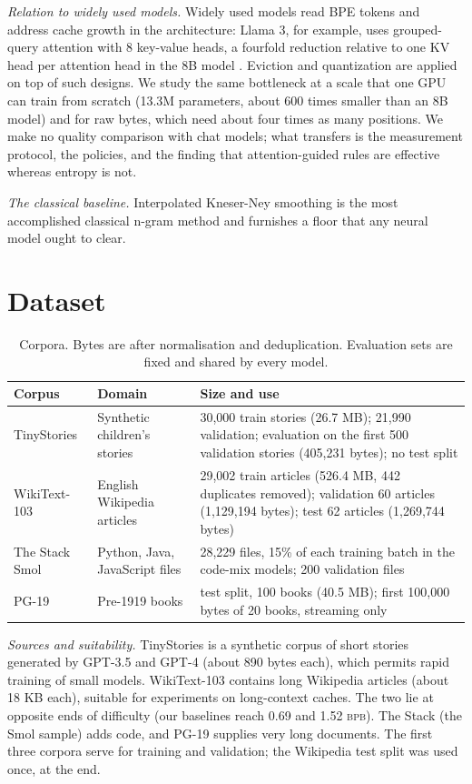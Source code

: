 \documentclass[10pt,twocolumn]{extarticle}
\newcommand{\bpb}{\textsc{bpb}}
\begin{document}
\textit{Relation to widely used models.} Widely used models read BPE tokens and address cache growth in the architecture: Llama 3, for example, uses grouped-query attention with 8 key-value heads, a fourfold reduction relative to one KV head per attention head in the 8B model \citep{llama3team2024}. Eviction and quantization are applied on top of such designs. We study the same bottleneck at a scale that one GPU can train from scratch (13.3M parameters, about 600 times smaller than an 8B model) and for raw bytes, which need about four times as many positions. We make no quality comparison with chat models; what transfers is the measurement protocol, the policies, and the finding that attention-guided rules are effective whereas entropy is not.


\textit{The classical baseline.} Interpolated Kneser-Ney smoothing \citep{kneser1995improved,chen1999smoothing} is the most accomplished classical n-gram method and furnishes a floor that any neural model ought to clear.

\section{Dataset}\label{sec:data}
\begin{table}[!t]
\centering\footnotesize
\caption{Corpora. Bytes are after normalisation and deduplication. Evaluation sets are fixed and shared by every model.}\label{tab:data}
\begin{tabular}{@{}p{2.3cm}p{4.2cm}p{10.0cm}@{}}
\toprule
Corpus & Domain & Size and use\\
\midrule
TinyStories & Synthetic children's stories & 30,000 train stories (26.7 MB); 21,990 validation; evaluation on the first 500 validation stories (405,231 bytes); no test split\\
WikiText-103 & English Wikipedia articles & 29,002 train articles (526.4 MB, 442 duplicates removed); validation 60 articles (1,129,194 bytes); test 62 articles (1,269,744 bytes)\\
The Stack Smol & Python, Java, JavaScript files & 28,229 files, 15\% of each training batch in the code-mix models; 200 validation files\\
PG-19 & Pre-1919 books & test split, 100 books (40.5 MB); first 100,000 bytes of 20 books, streaming only\\
\bottomrule
\end{tabular}
\end{table}

\textit{Sources and suitability.} TinyStories \citep{eldan2023tinystories} is a synthetic corpus of short stories generated by GPT-3.5 and GPT-4 (about 890 bytes each), which permits rapid training of small models. WikiText-103 \citep{merity2016pointer} contains long Wikipedia articles (about 18 KB each), suitable for experiments on long-context caches. The two lie at opposite ends of difficulty (our baselines reach 0.69 and 1.52 \bpb). The Stack \citep{kocetkov2022stack} (the Smol sample) adds code, and PG-19 \citep{rae2019compressive} supplies very long documents. The first three corpora serve for training and validation; the Wikipedia test split was used once, at the end.
\end{document}
